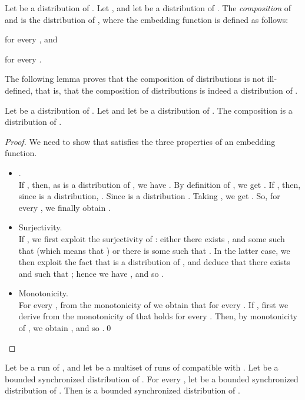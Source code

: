 \documentclass{llncs}
\begin{document}
\begin{definition}
\begin{definition}
  Let  be a distribution of . Let , and let
   be a distribution of .  The
  {\em composition} of  and  is the distribution 
   of , where the embedding function  is 
  defined as follows:
  \begin{compactitem}
  \item  for every , and
  \item  for every .
  \end{compactitem}
\end{definition}

The following lemma proves that the composition of distributions is not ill-defined, that is, 
that the composition of distributions is indeed a distribution of . 

\begin{lemma}
\label{lem:nesting}
  Let  be a distribution of . Let  and let
   be a distribution of . The composition  is a distribution of
  . 
\end{lemma}

\begin{proof}
  We need to show that  satisfies the three properties of an embedding function. 

  \begin{itemize}
  \item .\\
          If , then,  as  is a
		distribution of , we have .
           By definition of , we get .
           If , then, since  is a distribution,
		.  Since 
		is a distribution . Taking
		, we get .
           So, for every , we finally obtain .
  \item Surjectivity.\\
    If , we first exploit the surjectivity of
    : either there exists , and
    some  such that  (which
    means that ) or there is
    some  such that . In the
    latter case, we then exploit the fact that  is a
    distribution of , and deduce that there exists  and  such that ;
    hence we have , and so
    .

  \item Monotonicity. \\
    For every , from the monotonicity of  we
    obtain that  for every  . If , first we
    derive from the monotonicity of  that  
    holds for every . Then, by monotonicity of , we obtain , and so .\qed
  \end{itemize}
\end{proof}

\begin{lemma}
  Let  be a run of , and let  be a multiset of runs of  compatible with 
  . Let  be a bounded synchronized
  distribution of . For every , let  be a bounded synchronized
  distribution of . Then  is a
  bounded synchronized distribution of .
\end{lemma}


\end{definition}
\end{document}
